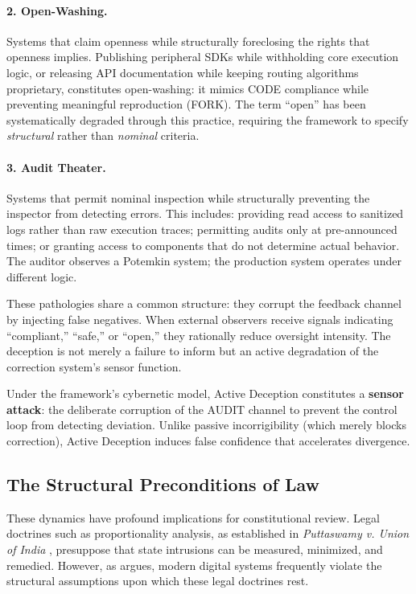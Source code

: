 \documentclass{article}
\begin{document}
\paragraph{2. Open-Washing.} Systems that claim openness while structurally foreclosing the rights that openness implies. Publishing peripheral SDKs while withholding core execution logic, or releasing API documentation while keeping routing algorithms proprietary, constitutes open-washing: it mimics CODE compliance while preventing meaningful reproduction (FORK). The term ``open'' has been systematically degraded through this practice, requiring the framework to specify \textit{structural} rather than \textit{nominal} criteria.

\paragraph{3. Audit Theater.} Systems that permit nominal inspection while structurally preventing the inspector from detecting errors. This includes: providing read access to sanitized logs rather than raw execution traces; permitting audits only at pre-announced times; or granting access to components that do not determine actual behavior. The auditor observes a Potemkin system; the production system operates under different logic.

These pathologies share a common structure: they corrupt the feedback channel by injecting false negatives. When external observers receive signals indicating ``compliant,'' ``safe,'' or ``open,'' they rationally reduce oversight intensity. The deception is not merely a failure to inform but an active degradation of the correction system's sensor function.

Under the framework's cybernetic model, Active Deception constitutes a \textbf{sensor attack}: the deliberate corruption of the AUDIT channel to prevent the control loop from detecting deviation. Unlike passive incorrigibility (which merely blocks correction), Active Deception induces false confidence that accelerates divergence.

\subsection{The Structural Preconditions of Law}
\label{subsec:rule-of-ledger}

These dynamics have profound implications for constitutional review. Legal doctrines such as proportionality analysis, as established in \textit{Puttaswamy v. Union of India} \citep{puttaswamy2017}, presuppose that state intrusions can be measured, minimized, and remedied. However, as \citet{bhatia2019} argues, modern digital systems frequently violate the structural assumptions upon which these legal doctrines rest.
\end{document}
